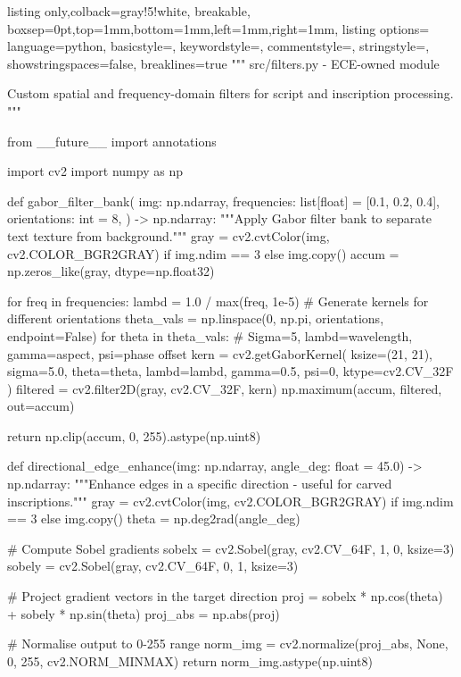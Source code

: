 \begin{tcblisting}{listing only,colback=gray!5!white, breakable, boxsep=0pt,top=1mm,bottom=1mm,left=1mm,right=1mm,
listing options={
language=python,
basicstyle=\footnotesize\ttfamily,
keywordstyle=\color{blue},
commentstyle=\color{gray},
stringstyle=\color{purple},
showstringspaces=false,
breaklines=true
}}
"""
src/filters.py - ECE-owned module

Custom spatial and frequency-domain filters for script and inscription processing.
"""

from __future__ import annotations

import cv2
import numpy as np


def gabor_filter_bank(
    img: np.ndarray,
    frequencies: list[float] = [0.1, 0.2, 0.4],
    orientations: int = 8,
) -> np.ndarray:
    """Apply Gabor filter bank to separate text texture from background."""
    gray = cv2.cvtColor(img, cv2.COLOR_BGR2GRAY) if img.ndim == 3 else img.copy()
    accum = np.zeros_like(gray, dtype=np.float32)

    for freq in frequencies:
        lambd = 1.0 / max(freq, 1e-5)
        # Generate kernels for different orientations
        theta_vals = np.linspace(0, np.pi, orientations, endpoint=False)
        for theta in theta_vals:
            # Sigma=5, lambd=wavelength, gamma=aspect, psi=phase offset
            kern = cv2.getGaborKernel(
                ksize=(21, 21),
                sigma=5.0,
                theta=theta,
                lambd=lambd,
                gamma=0.5,
                psi=0,
                ktype=cv2.CV_32F
            )
            filtered = cv2.filter2D(gray, cv2.CV_32F, kern)
            np.maximum(accum, filtered, out=accum)

    return np.clip(accum, 0, 255).astype(np.uint8)


def directional_edge_enhance(img: np.ndarray, angle_deg: float = 45.0) -> np.ndarray:
    """Enhance edges in a specific direction - useful for carved inscriptions."""
    gray = cv2.cvtColor(img, cv2.COLOR_BGR2GRAY) if img.ndim == 3 else img.copy()
    theta = np.deg2rad(angle_deg)

    # Compute Sobel gradients
    sobelx = cv2.Sobel(gray, cv2.CV_64F, 1, 0, ksize=3)
    sobely = cv2.Sobel(gray, cv2.CV_64F, 0, 1, ksize=3)

    # Project gradient vectors in the target direction
    proj = sobelx * np.cos(theta) + sobely * np.sin(theta)
    proj_abs = np.abs(proj)

    # Normalise output to 0-255 range
    norm_img = cv2.normalize(proj_abs, None, 0, 255, cv2.NORM_MINMAX)
    return norm_img.astype(np.uint8)



\end{tcblisting}
